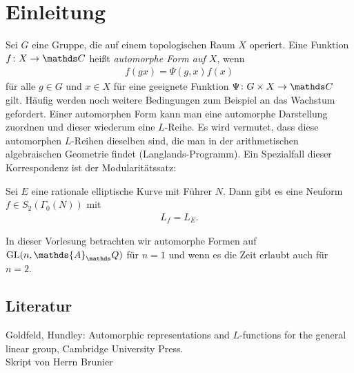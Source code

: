 \chapter*{Einleitung}
Sei $G$ eine Gruppe, die auf einem topologischen Raum $X$ operiert.
Eine Funktion $f\colon X \to \C$ heißt \emph{automorphe Form auf $X$}, wenn
\begin{align*}
f(gx)=  \Psi(g,x) f(x)
\end{align*}
für alle $g\in G$ und $x\in X$ für eine geeignete Funktion $\Psi \colon G \times X \to \C $ gilt.
Häufig werden noch weitere Bedingungen zum Beispiel an das Wachstum gefordert.
Einer automorphen Form kann man eine automorphe Darstellung zuordnen und dieser wiederum eine $L$-Reihe.
Es wird vermutet, dass diese automorphen $L$-Reihen dieselben sind, die man in der arithmetischen algebraischen Geometrie findet (Langlands-Programm).
Ein Spezialfall dieser Korrespondenz ist der Modularitätssatz:
\begin{satz}
Sei $E$ eine rationale elliptische Kurve mit Führer $N$.
Dann gibt es eine Neuform $f\in S_2(\Gamma_0(N))$ mit
\begin{align*}
L_f=L_E.
\end{align*}
\end{satz}
In dieser Vorlesung betrachten wir automorphe Formen auf $\GL(n,\mathds{A}_\Q)$ für $n=1$ und wenn es die Zeit erlaubt auch für $n=2$.

\section*{Literatur}
Goldfeld, Hundley: Automorphic representations and $L$-functions for the general linear group, Cambridge University Press.\\
Skript von Herrn Brunier